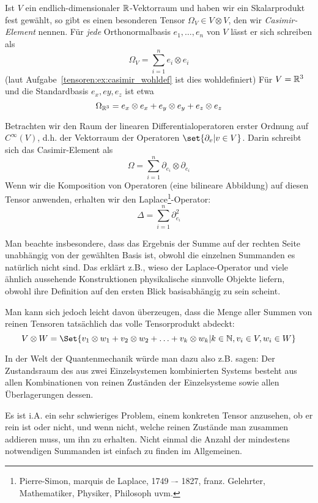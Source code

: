 \begin{example}\label{tensoren:casimir_element}
Ist $V$ ein endlich-dimensionaler $\mathbb{R}$-Vektorraum und haben wir ein Skalarprodukt fest gewählt, so gibt es einen besonderen Tensor $\Omega_V \in V\otimes V$, den wir \emph{Casimir-Element} nennen. Für \textit{jede} Orthonormalbasis $e_1, \ldots, e_n$ von $V$ lässt er sich schreiben als
\[\Omega_V = \sum_{i=1}^n e_i \otimes e_i\]
(laut Aufgabe~\ref{tensoren:ex:casimir_wohldef} ist dies wohldefiniert)
Für $V=\mathbb{R}^3$ und die Standardbasis $e_x, ey, e_z$ ist etwa
\[\Omega_{\mathbb{R}^3} = e_x\otimes e_x + e_y\otimes e_y + e_z\otimes e_z\]

Betrachten wir den Raum der linearen Differentialoperatoren erster Ordnung auf $C^\infty(V)$, d.h. der Vektorraum der Operatoren $\set{\partial_v | v\in V}$. Darin schreibt sich das Casimir-Element als
\[\Omega = \sum_{i=1}^n \partial_{e_i} \otimes \partial_{e_i}\]
Wenn wir die Komposition von Operatoren (eine bilineare Abbildung) auf diesen Tensor anwenden, erhalten wir den Laplace\footnote{Pierre-Simon, marquis de Laplace, 1749 –- 1827, franz. Gelehrter, Mathematiker, Physiker, Philosoph uvm.}-Operator:
\[\Delta = \sum_{i=1}^n \partial_{e_i}^2\]

Man beachte insbesondere, dass das Ergebnis der Summe auf der rechten Seite unabhängig von der gewählten Basis ist, obwohl die einzelnen Summanden es natürlich nicht sind. Das erklärt z.B., wieso der Laplace-Operator und viele ähnlich aussehende Konstruktionen physikalische sinnvolle Objekte liefern, obwohl ihre Definition auf den ersten Blick basisabhängig zu sein scheint.
\end{example}

\begin{remark}
Man kann sich jedoch leicht davon überzeugen, dass die Menge aller Summen von reinen Tensoren tatsächlich das volle Tensorprodukt abdeckt:
\[V\otimes W = \Set{v_1\otimes w_1 + v_2\otimes w_2 + \ldots + v_k\otimes w_k | k\in\IN, v_i\in V, w_i\in W}\]

In der Welt der Quantenmechanik würde man dazu also z.B. sagen: Der Zustandsraum des aus zwei Einzelsystemen kombinierten Systems besteht aus allen Kombinationen von reinen Zuständen der Einzelsysteme sowie allen Überlagerungen dessen.

Es ist i.A. ein sehr schwieriges Problem, einem konkreten Tensor anzusehen, ob er rein ist oder nicht, und wenn nicht, welche reinen Zustände man zusammen addieren muss, um ihn zu erhalten. Nicht einmal die Anzahl der mindestens notwendigen Summanden ist einfach zu finden im Allgemeinen.
\end{remark}

